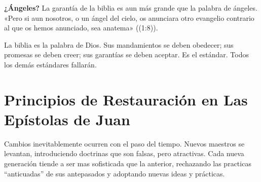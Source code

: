 \documentclass[12pt, twoside, openright]{book}
\begin{document}
\textbf{¿Ángeles?} La garantía de la biblia es aun más grande que la palabra de ángeles. «Pero si aun nosotros, o un ángel del cielo, os anunciara otro evangelio contrario al que os hemos anunciado, sea anatema» ((1:8)).

La biblia es la palabra de Dios. Sus mandamientos se deben obedecer; sus promesas se deben creer; sus garantías se deben aceptar. Es el estándar. Todos los demás estándares fallarán. 

\section{Principios de Restauración en Las Epístolas de Juan}
Cambios inevitablemente ocurren con el paso del tiempo. Nuevos maestros se levantan, introduciendo doctrinas que son falsas, pero atractivas. Cada nueva generación tiende a ser mas sofisticada que la anterior, rechazando las practicas “anticuadas” de sus antepasados y adoptando nuevas ideas y prácticas. 
\end{document}
